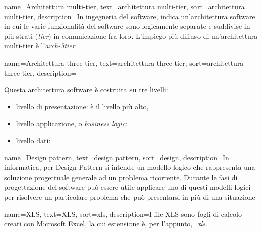 {
    name=Architettura multi-tier,
    text=architettura multi-tier,
    sort=architettura multi-tier,
    description={In ingegneria del software, indica un'architettura software in cui le varie funzionalità del software sono logicamente separate e suddivise in più strati (\textit{tier}) in comunicazione fra loro. L'impiego più diffuso di un'architettura multi-tier è l'\emph{\gls{arch-3tier}}\glsfirstoccur   
}}

{
    name=Architettura three-tier,
    text=architettura three-tier,
    sort=architettura three-tier,
    description={Questa architettura software è costruita su tre livelli:
        \begin{itemize}
            \item livello di presentazione: è il livello più alto, 
            \item livello applicazione, o \textit{business logic}:
            \item livello dati:
        \end{itemize}
}}

{
    name=Design pattern,
    text=design pattern,
    sort=design,
    description={In informatica, per Design Pattern si intende un modello logico che rappresenta una soluzione progettuale generale ad un problema ricorrente. Durante le fasi di progettazione del software può essere utile applicare uno di questi modelli logici per risolvere un particolare problema che può presentarsi in più di una situazione
}}

{
    name=XLS,
    text=XLS,
    sort=xls,
    description={I file XLS sono fogli di calcolo creati con Microsoft Excel, la cui estensione è, per l'appunto, \textit{.xls}.
}}

